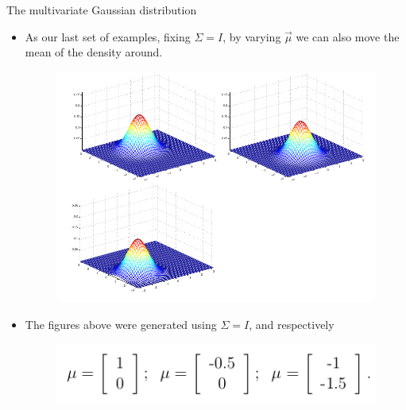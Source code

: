 \documentclass[handout]{beamer}
\begin{document}
\begin{frame}[fragile]{The multivariate Gaussian distribution}
\scriptsize{
\begin{itemize}
 
  \item   As our last set of examples, fixing $\Sigma = I$, by varying $\vec{\mu}$ we can also move the mean of the density around.
  
  \begin{figure}[h!]
	\centering
	\includegraphics[scale=0.25]{pics/mgaussian3.png}
\end{figure}
 

 \item The figures above were generated using $\Sigma = I$, and respectively
 
   \begin{figure}[h!]
	\centering
	\includegraphics[scale=0.3]{pics/mgaussian5.png}
\end{figure}
 
\end{itemize}
 

 
}
\end{frame}
\end{document}
